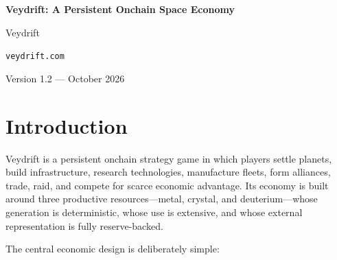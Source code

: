\documentclass[11pt]{article}
\newcommand{\token}[1]{\texttt{\$#1}}
\begin{document}
\begin{center}
  {\LARGE\bfseries Veydrift: A Persistent Onchain Space Economy\par}
  \vspace{1.1em}
  {\large Veydrift\par}
  \texttt{veydrift.com}\par
  \vspace{0.5em}
  {\small Version 1.2 --- October 2026\par}
\end{center}

\vspace{1em}
\begin{abstract}
Veydrift is a persistent onchain strategy game in which players settle planets, construct infrastructure, research technologies, manufacture fleets, form alliances, trade, and raid. Three productive resources---metal, crystal, and deuterium---exist both as in-game units and as fully reserve-backed tokens on Base. The Rift connects these domains: market resources enter the game immediately, while resources leaving the game remain locked on a planet for four weeks, visible and vulnerable to raids. A fixed-supply \token{VEYDRIFT} token routes liquidity between ETH and the three resources. Liquidity is seeded directly into full-range Uniswap v4 pools on Base, and every liquidity position is time-locked for one year. This paper defines the game formulas, reserve model, token supplies, liquidity structure, Rift mechanics, and economic controls that allow production, conflict, trade, and long-term resource sinks to reinforce one another.
\end{abstract}

\section{Introduction}

Veydrift is a persistent onchain strategy game in which players settle planets, build infrastructure, research technologies, manufacture fleets, form alliances, trade, raid, and compete for scarce economic advantage. Its economy is built around three productive resources---metal, crystal, and deuterium---whose generation is deterministic, whose use is extensive, and whose external representation is fully reserve-backed.

The central economic design is deliberately simple:
\end{document}
